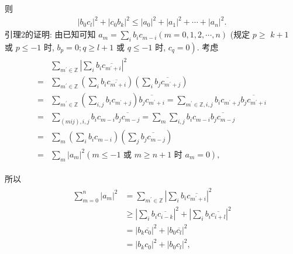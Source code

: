 \begin{solution}
	则
	\begin{align*}
		\left|b_0 c_l\right|^2+\left|c_0 b_k\right|^2 \leqslant\left|a_0\right|^2+\left|a_1\right|^2+\cdots+\left|a_n\right|^2 .
	\end{align*}
	引理2的证明: 由已知可知 $a_m=\sum_i b_i c_{m-i}(m=0,1,2, \cdots, n)$ (规定 $p \geqslant$ $k+1$ 或 $p \leqslant-1$ 时, $b_p=0 ; q \geqslant l+1$ 或 $q \leqslant-1$ 时, $\left.c_q=0\right)$.
	考虑
	\begin{align*}
		\begin{aligned}
			  & \sum_{m^{\prime} \in \mathbb{Z}}\left|\sum_i b_i \overline{c_{m^{\prime}+i}}\right|^2                                                                                                                     \\
			= & \sum_{m^{\prime} \in \mathbb{Z}}\left(\sum_i b_i \overline{c_{m^{\prime}+i}}\right)\left(\sum_i \overline{b_j c_{m^{\prime}+j}}\right)                                                                    \\
			= & \sum_{m^{\prime} \in \mathbb{Z}}\left(\sum_{i, j} b_i c_{m^{\prime}+j}\right) \overline{b_j c_{m^{\prime}+i}}=\sum_{m^{\prime} \in \mathbb{Z}, i, j} b_i c_{m^{\prime}+j} \overline{b_j c_{m^{\prime}+i}} \\
			= & \sum_{(m i j), i, j} b_i c_{m-i} \overline{b_j c_{m-j}}=\sum_m \sum_{i, j} b_i c_{m-i} \overline{b_j c_{m-j}}                                                                                             \\
			= & \sum_m\left(\sum_i b_i c_{m-i}\right)\left(\sum_j \overline{b_j c_{m-j}}\right)                                                                                                                           \\
			= & \sum_m\left|a_m\right|^2\left(m \leqslant-1 \text { 或 } m \geqslant n+1 \text { 时 } a_m=0\right),
		\end{aligned}
	\end{align*}

	所以
	\begin{align*}
		\begin{aligned}
			\sum_{m=0}^n\left|a_m\right|^2 & =\sum_{m^{\prime} \in \mathbb{Z}}\left|\sum_i b_i \overline{c_{m^{\prime}+i}}\right|^2             \\
			                               & \geqslant\left|\sum_i b_i \overline{c_{i-k}}\right|^2+\left|\sum_i b_i \overline{c_{i+l}}\right|^2 \\
			                               & =\left|b_k \overline{c_0}\right|^2+\left|b_0 \overline{c_l}\right|^2                               \\
			                               & =\left|b_k c_0\right|^2+\left|b_0 c_l\right|^2,
		\end{aligned}
	\end{align*}


\end{solution}
